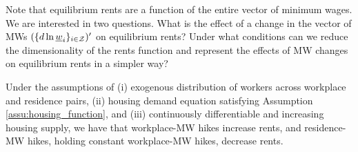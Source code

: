 Note that equilibrium rents are a function of the entire vector of minimum wages. 
We are interested in two questions.
What is the effect of a change in the vector of MWs $(\{d \ln \underline{w}_i\}_{i\in\mathcal{Z}})'$
on equilibrium rents?
Under what conditions can we reduce the dimensionality of the rents function and 
represent the effects of MW changes on equilibrium rents in a simpler way?

\begin{prop}\label{prop:comparative_statics}
    Under the assumptions of
    (i) exogenous distribution of workers across workplace and residence pairs, 
    (ii) housing demand equation satisfying Assumption \ref{assu:housing_function}, 
    and 
    (iii) continuously differentiable and increasing housing supply, we have that
    workplace-MW hikes increase rents, and residence-MW hikes, holding constant 
    workplace-MW hikes, decrease rents.
\end{prop}

